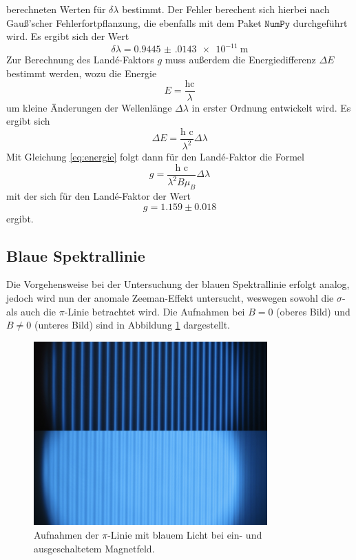 berechneten Werten für $\delta \lambda$ bestimmt. Der Fehler berechent sich hierbei nach Gauß'scher Fehlerfortpflanzung,
die ebenfalls mit dem Paket $\texttt{NumPy}$ durchgeführt wird. Es ergibt sich der Wert
\begin{equation*}
    \delta \lambda = \SI{0.9445(0143)e-11}{\meter}
\end{equation*}
Zur Berechnung des Landé-Faktors $g$ muss außerdem die Energiedifferenz $\Delta E$ bestimmt werden, wozu die Energie
\begin{equation*}
    E = \frac{\text{hc}}{\lambda}
\end{equation*} 
um kleine Änderungen der Wellenlänge $\Delta \lambda$ in erster Ordnung entwickelt wird. Es ergibt sich
\begin{equation*}
    \Delta E = \frac{\text{h c}}{\lambda^2} \Delta \lambda
\end{equation*}
Mit Gleichung \eqref{eq:energie} folgt dann für den Landé-Faktor die Formel 
\begin{equation} 
    \label{eq:landee}
    g = \frac{\text{h c}}{\lambda^2 B \mu_B} \Delta \lambda
\end{equation}
mit der sich für den Landé-Faktor der Wert
\begin{equation*}
    g = 1.159\pm 0.018
\end{equation*}
ergibt.

\subsection{Blaue Spektrallinie}
Die Vorgehensweise bei der Untersuchung der blauen Spektrallinie erfolgt analog, jedoch wird nun der anomale Zeeman-Effekt
untersucht, weswegen sowohl die $\sigma$- als auch die $\pi$-Linie betrachtet wird. 
Die Aufnahmen bei $B = 0$ (oberes Bild) und $B \neq 0$ (unteres Bild) sind in Abbildung \ref{fig:afig3} dargestellt.
\FloatBarrier
\begin{figure}
    \centering
    \includegraphics[width=0.8\textwidth]{pi.jpg}
    \caption{Aufnahmen der $\pi$-Linie mit blauem Licht bei ein- und ausgeschaltetem Magnetfeld.}
    \label{fig:afig3}
\end{figure}
\FloatBarrier

